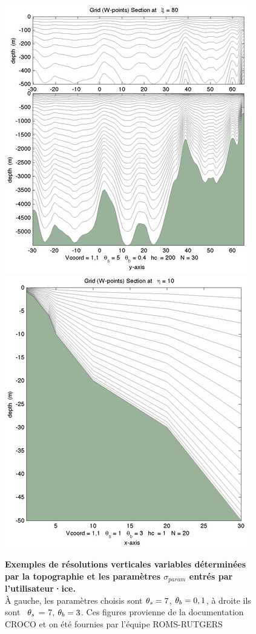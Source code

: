 \documentclass[10pt,a4paper,titlepage]{article}
\begin{document}
\begin{figure}[h!]
    \centering
    \includegraphics{../images/vcoord_ex1.png}
    \includegraphics{../images/vcoord_ex5.png}
    \caption{\textbf{Exemples de résolutions verticales variables déterminées par la topographie et les paramètres  $\sigma_{param}$ entrés par l'utilisateur·ice.} \\
        À gauche, les paramètres choisis sont  $\protect\theta_s = 7$, $\protect\theta_b = 0,1$, à droite ils sont  $\protect\theta_s$ = 7, $\protect\theta_b = 3$.
        Ces figures provienne de la documentation CROCO \cite{grid_doc} et on été fournies par l'équipe ROMS-RUTGERS}
    \label{fig:vertical_resolution}
\end{figure}
\end{document}

